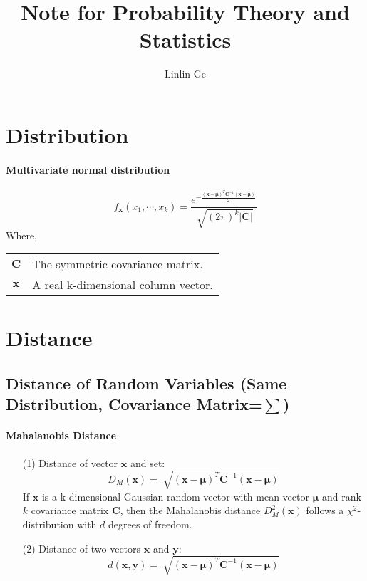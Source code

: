 \documentclass[10pt]{article}
\title{Note for Probability Theory and Statistics}
\author{Linlin Ge}
\begin{document}
\maketitle

\section{Distribution}
\paragraph{Multivariate normal distribution} \mbox{}
$$  f_{\bm{x}}(x_1,\cdots,x_k)=\frac{ e^{-\frac{\displaystyle (\bm{x} -\bm{\mu})^T \bm{C}^{-1}(\bm{x}-\bm{\mu})}{2}}}{\sqrt[]{(2 \pi)^k \vert \bm{C} \vert}}$$
Where, 
\begin{table}[H]
\begin{tabular}{cl}
$\bm{C}$ & The symmetric covariance matrix. \\
$\bm{x}$ & A real k-dimensional column vector.\\
\end{tabular}
\end{table}



\section{Distance}
\subsection{Distance of Random Variables (Same Distribution, Covariance Matrix=$\sum$)}
\paragraph{Mahalanobis Distance} \mbox{}
\begin{itemize}
\item[(1)] Distance of vector $\bm{x}$ and set:
$$D_M(\bm{x})=\sqrt[]{(\bm{x}-\bm{\mu})^{T}\bm{C}^{-1}(\bm{x}-\bm{\mu})}$$
If $\bm{x}$ is a k-dimensional Gaussian random vector with mean vector $\bm{\mu}$ and rank $k$ covariance matrix $\bm{C}$, then the Mahalanobis distance $D^2_M(\bm{x})$ follows a $\chi^2$-distribution with $d$ degrees of freedom.

\item[(2)] Distance of two vectors $\bm{x}$ and $\bm{y}$:
$$d(\bm{x},\bm{y})=\sqrt[]{(\bm{x}-\bm{\mu})^{T}\bm{C}^{-1}(\bm{x}-\bm{\mu})}$$

\end{itemize}


\begin{thebibliography}{1}



\end{thebibliography}
\end{document}
